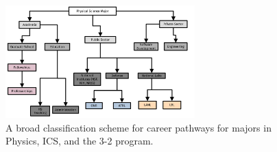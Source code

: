\documentclass[../../main.tex]{subfiles}
\begin{document}
\begin{figure}[hb]
\centering
\includegraphics[width=0.65\textwidth]{figures/tree.pdf}
\caption{\label{fig:tree}  A broad classification scheme for career pathways for majors in Physics, ICS, and the 3-2 program.}
\end{figure}
\end{document}
